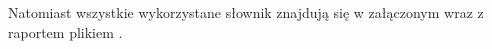 \documentclass{classrep}
\begin{document}
Natomiast wszystkie wykorzystane słownik znajdują się w załączonym wraz z raportem plikiem \cite{slowniki}.
\end{document}
